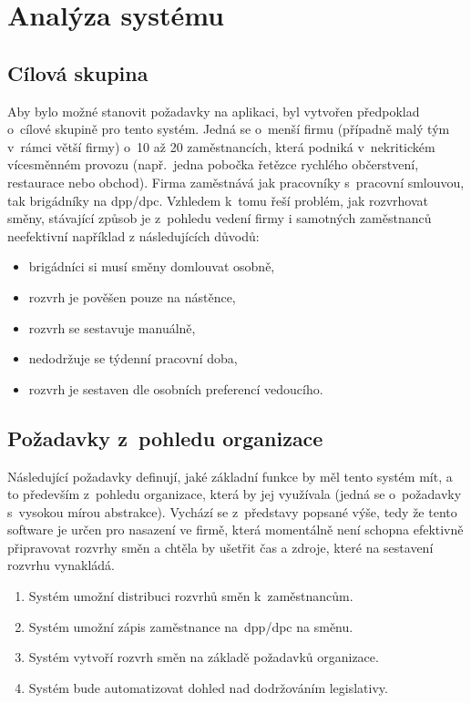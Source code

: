 \documentclass[a4paper,11pt,openany,twoside]{book}
\begin{document}
\chapter{Analýza systému}

\section{Cílová skupina}
Aby bylo možné stanovit požadavky na aplikaci, byl vytvořen předpoklad o~cílové skupině pro tento systém. Jedná se o~menší firmu (případně malý tým v~rámci větší firmy) o~10 až 20 zaměstnancích, která podniká v~nekritickém vícesměnném provozu (např.~jedna pobočka řetězce rychlého občerstvení, restaurace nebo obchod). Firma zaměstnává jak pracovníky s~pracovní smlouvou, tak brigádníky na \acs{dpp}/\acs{dpc}. Vzhledem k~tomu řeší problém, jak rozvrhovat směny, stávající způsob je z~pohledu vedení firmy i samotných zaměstnanců neefektivní například z následujících důvodů:
\begin{itemize}
	\item brigádníci si musí směny domlouvat osobně,
	\item rozvrh je pověšen pouze na nástěnce,
	\item rozvrh se sestavuje manuálně,
	\item nedodržuje se týdenní pracovní doba,
	\item rozvrh je sestaven dle osobních preferencí vedoucího.
\end{itemize}


\section{Požadavky z~pohledu organizace}

Následující požadavky definují, jaké základní funkce by měl tento systém mít, a to především z~pohledu organizace, která by jej využívala (jedná se o~požadavky s~vysokou mírou abstrakce). Vychází se z~představy popsané výše, tedy že tento software je určen pro nasazení ve firmě, která momentálně není schopna efektivně připravovat rozvrhy směn a chtěla by ušetřit čas a zdroje, které na sestavení rozvrhu vynakládá.

\begin{enumerate}[label=\textbf{B\arabic*.}]
	\item Systém umožní distribuci rozvrhů směn k~zaměstnancům.
	\item Systém umožní zápis zaměstnance na~\acs{dpp}/\acs{dpc} na směnu.
	\item Systém vytvoří rozvrh směn na základě požadavků organizace.
	\item Systém bude automatizovat dohled nad dodržováním legislativy.
\end{enumerate}
\end{document}
